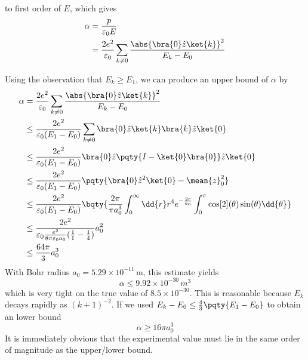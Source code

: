 \documentclass[12pt]{article}
\begin{document}
        to first order of \(E\), which gives \begin{align*}
            \alpha &= \frac{p}{\varepsilon_0 E}\\
            &= \frac{2e^2}{\varepsilon_0} \sum_{k\neq 0} \frac{\abs{\bra{0} \hat{z} \ket{k}}^2}{E_k - E_0}
        \end{align*}

        Using the observation that \(E_k \geq E_1\), we can produce an upper bound of \(\alpha\) by \begin{align*}
            \alpha &= \frac{2e^2}{\varepsilon_0} \sum_{k\neq 0} \frac{\abs{\bra{0} \hat{z} \ket{k}}^2}{E_k - E_0}\\
            &\leq \frac{2e^2}{\varepsilon_0({E_1 - E_0})} \sum_{k\neq 0} \bra{0} \hat{z} \ket{k} \bra{k} \hat{z} \ket{0} \\
            &\leq \frac{2e^2}{\varepsilon_0({E_1 - E_0})} \bra{0} \hat{z} \pqty{I - \ket{0} \bra{0} } \hat{z} \ket{0} \\
            &\leq \frac{2e^2}{\varepsilon_0({E_1 - E_0})} \pqty{\bra{0} \hat{z}^2 \ket{0} - \mean{z}_0^2}\\
            &\leq \frac{2e^2}{\varepsilon_0({E_1 - E_0})} \bqty{\frac{2\pi}{\pi a_0^3} \int_0^\infty \dd{r}r^4 e^{ - \frac{2r}{a_0}} \int_0^\pi \cos[2](\theta) \sin(\theta)\dd{\theta}}\\
            &\leq \frac{2e^2}{\varepsilon_0\frac{e^2}{8\pi\varepsilon_0 a_0}(\frac{1}{1} - \frac{1}{4})} a_0^2 \\
            &\leq \frac{64\pi}{3} a_0^3 
        \end{align*}
        With Bohr radius \(a_0 = 5.29 \times 10^{ - 11}\, \mathrm{m}\), this estimate yields \[
            \alpha \leq  9.92 \times 10^{ - 30}\, m^3
        \]
        which is very tight on the true value of \(8.5 \times 10^{ - 30}\). This is reasonable because \(E_k\) decays rapidly as \((k + 1)^{-2}\). If we used \(E_k - E_0 \leq \frac{4}{3}\pqty{E_1 - E_0}\) to obtain an lower bound \[
            \alpha \geq 16\pi a_0^3
        \]
        It is immediately obvious that the experimental value must lie in the same order of magnitude as the upper/lower bound.
\end{document}
